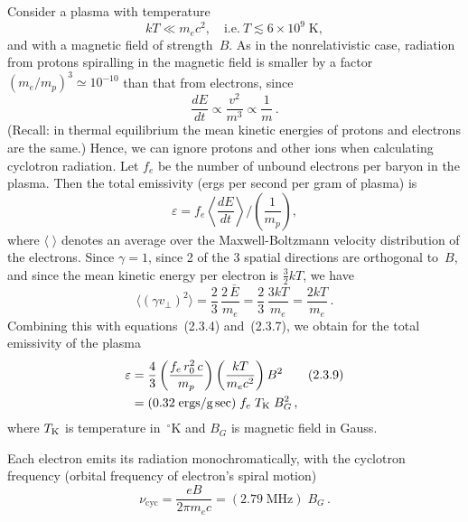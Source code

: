 \medskip
Consider a plasma with temperature
\begin{equation}
kT \ll m_e c^2, \quad \text{i.e.}\ T \lesssim 6 \times 10^9\;\text{K},
\tag{2.3.5}
\end{equation}
and with a magnetic field of strength~$B$. As in the nonrelativistic case, radiation
from protons spiralling
in the magnetic field is smaller by a factor $(m_e/m_p)^3 \simeq 10^{-10}$ than that from
electrons, since
\begin{equation}
\frac{dE}{dt} \propto \frac{v^2}{m^3} \propto \frac{1}{m}\,.
\tag{2.3.6}
\end{equation}
(Recall: in thermal equilibrium the mean kinetic energies of protons and electrons
are the same.) Hence, we can ignore protons and other ions when calculating
cyclotron radiation. Let $f_e$ be the number of unbound electrons per baryon in
the plasma. Then the total emissivity (ergs per second per gram of plasma) is
\begin{equation}
\varepsilon = f_e \left\langle \frac{dE}{dt} \right\rangle
\bigg/\!\left(\frac{1}{m_p}\right),
\tag{2.3.7}
\end{equation}
where $\langle\;\rangle$ denotes an average over the Maxwell-Boltzmann velocity distribution
of the electrons. Since $\gamma = 1$, since 2 of the 3 spatial directions are orthogonal
to~$B$, and since the mean kinetic energy per electron is $\tfrac{3}{2}kT$, we have
\begin{equation}
\langle (\gamma v_\perp)^2 \rangle
= \frac{2}{3}\,\frac{2\,\bar{E}}{m_e}
= \frac{2}{3}\,\frac{3kT}{m_e}
= \frac{2kT}{m_e}\,.
\tag{2.3.8}
\end{equation}
Combining this with equations~(2.3.4) and~(2.3.7), we obtain for the total
emissivity of the plasma
\begin{align}
\varepsilon &= \frac{4}{3}\left(\frac{f_e\,r_0^2\,c}{m_p}\right)
\left(\frac{kT}{m_e c^2}\right) B^2
\tag{2.3.9}\\
&= (0.32\;\text{ergs/g\,sec})\;f_e\;T_{\rm K}\;B_G^2\,,
\notag
\end{align}
where $T_{\rm K}$ is temperature in~${}^\circ$K and $B_G$ is magnetic field in Gauss.

Each electron emits its radiation monochromatically, with the cyclotron
frequency (orbital frequency of electron's spiral motion)
\begin{equation}
\nu_{\text{cyc}} = \frac{eB}{2\pi m_e c}
= (2.79\;\text{MHz})\;B_G\,.
\tag{2.3.10}
\end{equation}

